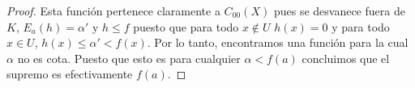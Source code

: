 \documentclass[letter,twoside,12pt]{article}
\begin{document}
\begin{enumerate}
\begin{enumerate}
\begin{proof}
Esta función pertenece claramente a $C_{00}(X) $ pues se desvanece fuera de $ K $,  $E_a(h) = \alpha' $ y $ h \leq f $ puesto que para todo $ x \not \in U $ $h(x) = 0$ y para todo $x \in U $, $h(x) \leq \alpha' < f(x) $. Por lo tanto, encontramos una función para la cual $\alpha $ no es cota. Puesto que esto es para cualquier $\alpha < f(a) $ concluimos que el supremo es efectivamente $f(a) $.

\end{proof}
\end{enumerate}
\end{enumerate}
\end{document}
